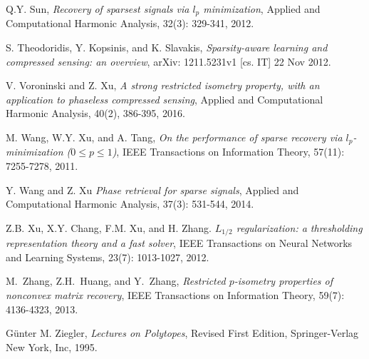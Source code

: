 \documentclass[12pt]{article}
\begin{document}
\begin{thebibliography}{abc99xyz}
Q.Y. Sun, \emph{Recovery of sparsest signals via $l_p$ minimization}, Applied and Computational Harmonic Analysis, 32(3): 329-341, 2012.

S. Theodoridis, Y. Kopsinis, and K. Slavakis, \emph{Sparsity-aware learning and compressed sensing: an overview}, arXiv: 1211.5231v1 [cs. IT] 22 Nov 2012.

V. Voroninski and Z. Xu, \emph{A strong restricted isometry property, with an application to phaseless compressed sensing}, Applied and Computational Harmonic Analysis, 40(2), 386-395, 2016.

M. Wang, W.Y. Xu, and A. Tang, \emph{On the performance of sparse recovery via $l_p$-minimization ($0\leqslant  p \leqslant  1$)}, IEEE Transactions on Information Theory, 57(11): 7255-7278, 2011.

Y. Wang and Z. Xu \emph{Phase retrieval for sparse signals}, Applied and Computational Harmonic Analysis, 37(3): 531-544, 2014.

Z.B. Xu, X.Y. Chang, F.M. Xu, and H. Zhang. \emph{$L_{1/2}$ regularization: a thresholding representation theory and a fast solver}, IEEE Transactions on Neural Networks and Learning Systems, 23(7): 1013-1027, 2012.

M.~Zhang, Z.H.~Huang, and Y.~Zhang, \emph{Restricted $p$-isometry properties of nonconvex matrix recovery}, IEEE Transactions on Information Theory, 59(7): 4136-4323, 2013.

 G\"unter M. Ziegler, \emph{ Lectures on Polytopes}, Revised First Edition, Springer-Verlag New York, Inc, 1995.

\end{thebibliography}
\end{document}
